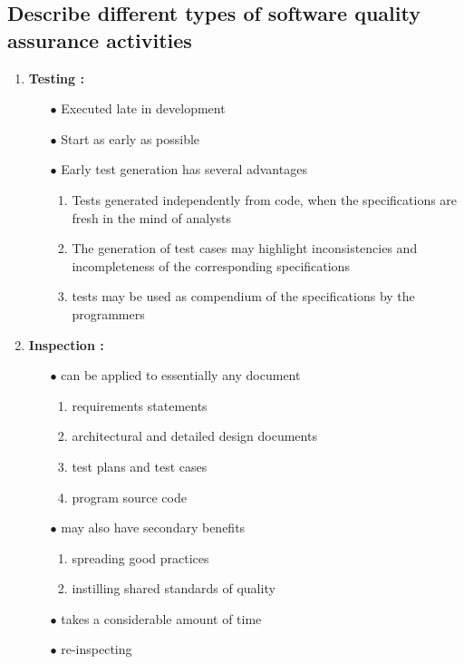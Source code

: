 \documentclass{article}
\begin{document}
\subsection{Describe different types of software quality assurance activities}
\begin{enumerate}
    \item \textbf{Testing : }
    \begin{itemize}
        \item [$\bullet$]Executed
late
in
development
        \item [$\bullet$]Start
as
early
as
possible
        \item [$\bullet$]Early
test
generation
has
several
advantages
        \begin{enumerate}
            \item Tests
generated
independently
from
code,
when
the
specifications
are
fresh
in
the
mind
of
analysts
            \item The
generation
of
test
cases
may
highlight
inconsistencies
and
incompleteness
of
the
corresponding
specifications
            \item tests
may
be
used
as
compendium
of
the
specifications
by
the
programmers
        \end{enumerate}
    \end{itemize}
    \item \textbf{Inspection : }
    \begin{itemize}
        \item [$\bullet$]can
be
applied
to
essentially
any
document
        \begin{enumerate}
            \item requirements
statements
            \item architectural
and
detailed
design
documents
            \item test
plans
and
test
cases
            \item program
source
code
        \end{enumerate}
        \item [$\bullet$]may
also
have
secondary
benefits
         \begin{enumerate}
            \item spreading
good
practices
            \item instilling
shared
standards
of
quality
        \end{enumerate}
        \item [$\bullet$]takes
a
considerable
amount
of
time
        \item [$\bullet$]re-inspecting

\end{itemize}
\end{enumerate}
\end{document}
